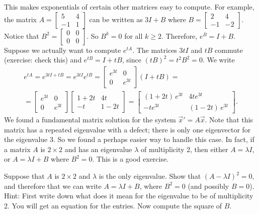 \documentclass{ximera}
\begin{document}
This makes exponentials of certain other matrices easy to compute. For example, the matrix 
$A = \left[ \begin{smallmatrix} 5 & 4 \\ -1 & 1 \end{smallmatrix} \right]$
can be written as $3I + B$ where
$B = \left[ \begin{smallmatrix} 2 & 4 \\ -1 & -2 \end{smallmatrix} \right]$.
Notice that $B^2 = \left[ \begin{smallmatrix} 0 & 0 \\ 0 & 0 \end{smallmatrix} \right]$.  So
$B^k = 0$ for all $k \geq 2$.  Therefore, $e^B = I + B$.  Suppose we actually want to compute $e^{tA}$.  The matrices $3tI$ and $tB$ commute (exercise: check this) and 
$e^{tB} = I + tB$, since ${(tB)}^2 = t^2 B^2 = 0$. We write
\begin{multline*}
    e^{tA} = e^{3tI + tB} = e^{3tI} e^{tB} = 
    \begin{bmatrix} 
        e^{3t} & 0 \\ 
        0 & e^{3t} 
    \end{bmatrix}
    \left( I + tB \right) = \\
    =
    \begin{bmatrix} 
        e^{3t} & 0 \\ 
        0 & e^{3t} 
    \end{bmatrix}
    \begin{bmatrix} 
        1+2t & 4t \\ 
        -t & 1-2t 
    \end{bmatrix}
    =
    \begin{bmatrix} 
        (1+2t)\,e^{3t} & 4te^{3t} \\ 
        -te^{3t} & (1-2t)\,e^{3t} 
    \end{bmatrix} .
\end{multline*}
We found a fundamental matrix solution for the system ${\vec{x}}' = A \vec{x}$.  Note that this matrix has a repeated eigenvalue with a defect; there is only one eigenvector for the eigenvalue 3.  So we found a perhaps easier way to handle this case.  In fact, if a matrix $A$ is $2 \times 2$ and has an eigenvalue $\lambda$ of multiplicity 2, then either $A = \lambda I$, or $A = \lambda I + B$ where $B^2 = 0$.  This is a good exercise.

\begin{exercise}%
    Suppose that $A$ is $2 \times 2$ and $\lambda$ is the only eigenvalue.  Show that ${(A - \lambda I)}^2 = 0$, and therefore that we can write $A = \lambda I + B$, where $B^2 = 0$ (and possibly $B=0$). Hint: First write down what does it mean for the eigenvalue to be of multiplicity 2. You will get an equation for the entries.  Now compute the square of $B$.
\end{exercise}
\end{document}

